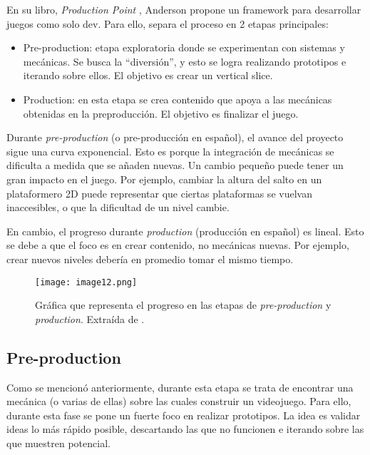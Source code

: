 \par En su libro, \textit{Production Point} \cite{andersonProductionPointHow2023}, Anderson propone un framework para desarrollar juegos como solo dev. Para ello, separa el proceso en 2 etapas principales:
\begin{itemize}
  \item Pre-production: etapa exploratoria donde se experimentan con sistemas y mecánicas. Se busca la “diversión”, y esto se logra realizando prototipos e iterando sobre ellos. El objetivo es crear un vertical slice.
  \item Production: en esta etapa se crea contenido que apoya a las mecánicas obtenidas  en la preproducción. El objetivo es finalizar el juego.
\end{itemize}
\par Durante \textit{pre-production} (o pre-producción en español), el avance del proyecto sigue una curva exponencial. Esto es porque la integración de mecánicas se dificulta a medida que se añaden nuevas.  Un cambio pequeño puede tener un gran impacto en el juego. Por ejemplo, cambiar la altura del salto en un plataformero 2D puede representar que ciertas plataformas se vuelvan inaccesibles, o que la dificultad de un nivel cambie.
\par En cambio, el progreso durante \textit{production} (producción en español) es lineal. Esto se debe a que el foco es en crear contenido, no mecánicas nuevas. Por ejemplo, crear nuevos niveles debería en promedio tomar el mismo tiempo.
\begin{figure}[H]
  \centering
  \texttt{[image: image12.png]}
  \caption{Gráfica que representa el progreso en las etapas de \textit{pre-production} y \textit{production}. Extraída de \cite{andersonProductionPointHow2023}.}
  \label{fig:x progreso de etapas Anderson}
\end{figure}
%
%
\subsection{Pre-production}
\par Como se mencionó anteriormente, durante esta etapa se trata de encontrar una mecánica (o varias de ellas) sobre las cuales construir un videojuego. Para ello, durante esta fase se pone un fuerte foco en realizar prototipos. La idea es validar ideas lo más rápido posible, descartando las que no funcionen e iterando sobre las que muestren potencial.
%
